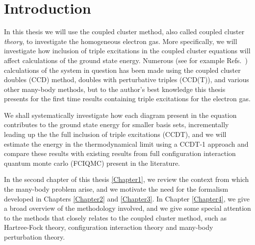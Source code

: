 

\chapter{Introduction} %

\label{Preface} %



In this thesis we will use the coupled cluster method, also called coupled cluster \emph{theory}, to investigate the homogeneous electron gas. More specifically, we will investigate how inclusion of triple excitations in the coupled cluster equations will affect calculations of the ground state energy.  Numerous (see for example Refs.~\cite{Baardsen2014, Shepherd2012, Roggero2013}) calculations of the system in question has been made using the coupled cluster doubles (CCD) method, doubles with perturbative triples (CCD(T)), and various other many-body methods, but to the author's best knowledge this thesis presents for the first time results containing triple excitations for the electron gas.

We shall systematically investigate how each diagram present in the equation contributes to the ground state energy for smaller basis sets, incrementally leading up the the full inclusion of triple excitations (CCDT), and we will estimate the energy in the thermodynamical limit using a CCDT-1 \cite{ShavittBartlett2009} approach and compare these results with existing results from full configuration interaction quantum monte carlo (FCIQMC) present in the literature.

In the second chapter of this thesis \ref{Chapter1}, we review the context from which the many-body problem arise, and we motivate the need for the formalism developed in Chapters \ref{Chapter2} and \ref{Chapter3}. In Chapter \ref{Chapter4}, we give a broad overview of the methodology involved, and we give some special attention to the methods that closely relates to the coupled cluster method, such as Hartree-Fock theory, configuration interaction theory and many-body perturbation theory.

